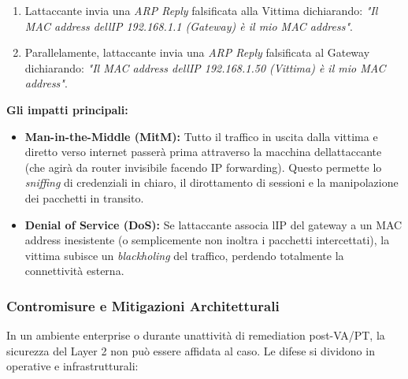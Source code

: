 \documentclass[11pt,a4paper]{article}
\begin{document}
\begin{enumerate}
\def\labelenumi{\arabic{enumi}.}
\item
  L\textquotesingle attaccante invia una \emph{ARP Reply} falsificata
  alla Vittima dichiarando: \emph{"Il MAC address
  dell\textquotesingle IP 192.168.1.1 (Gateway) è il mio MAC address"}.
\item
  Parallelamente, l\textquotesingle attaccante invia una \emph{ARP
  Reply} falsificata al Gateway dichiarando: \emph{"Il MAC address
  dell\textquotesingle IP 192.168.1.50 (Vittima) è il mio MAC address"}.
\end{enumerate}

\textbf{Gli impatti principali:}

\begin{itemize}
\item
  \textbf{Man-in-the-Middle (MitM):} Tutto il traffico in uscita dalla
  vittima e diretto verso internet passerà prima attraverso la macchina
  dell\textquotesingle attaccante (che agirà da router invisibile
  facendo IP forwarding). Questo permette lo \emph{sniffing} di
  credenziali in chiaro, il dirottamento di sessioni e la manipolazione
  dei pacchetti in transito.
\item
  \textbf{Denial of Service (DoS):} Se l\textquotesingle attaccante
  associa l\textquotesingle IP del gateway a un MAC address inesistente
  (o semplicemente non inoltra i pacchetti intercettati), la vittima
  subisce un \emph{blackholing} del traffico, perdendo totalmente la
  connettività esterna.
\end{itemize}

\subsubsection{Contromisure e Mitigazioni
Architetturali}\label{contromisure-e-mitigazioni-architetturali}

In un ambiente enterprise o durante un\textquotesingle attività di
remediation post-VA/PT, la sicurezza del Layer 2 non può essere affidata
al caso. Le difese si dividono in operative e infrastrutturali:
\end{document}
